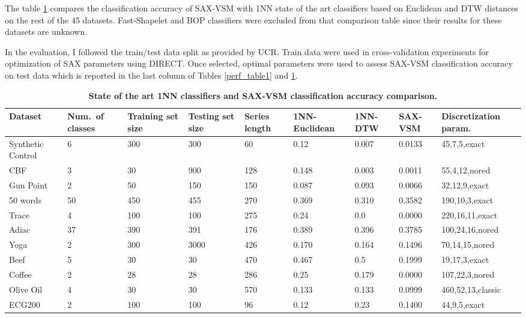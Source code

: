 The table \ref{perf_table2} compares the classification accuracy of SAX-VSM with 
1NN state of the art classifiers based on Euclidean and DTW distances on the rest of the 45 datasets. 
Fast-Shapelet and BOP classifiers were excluded from that comparison table since their 
results for these datasets are unknown.

In the evaluation, I followed the train/test data split as provided by UCR. Train data were used 
in cross-validation experiments for optimization of SAX parameters using \mbox{DIRECT}. 
Once selected, optimal parameters were used to assess SAX-VSM classification 
accuracy on test data which is reported in the last column of Tables \ref{perf_table1} 
and \ref{perf_table2}.

\newpage

\begin{table}[t!]
\caption{\bf State of the art 1NN classifiers and SAX-VSM classification accuracy comparison.}
 \label{perf_table2}
\centering
{\setlength{\extrarowheight}{1pt}%
{\scriptsize
\begin{tabularx}{\linewidth}{@{} l *7X @{} l}
\hline
Dataset & \mbox{Num. of} classes & Training set size & Testing set size & Series length & 1NN-Euclidean & 1NN-DTW & SAX-VSM & Discretization param. \\
\hline
Synthetic Control & 6 & 300 & 300 & 60 & 0.12 & 0.007 & 0.0133 & 45,7,5,exact \\
CBF & 3 & 30 & 900 & 128 & 0.148 & 0.003 & 0.0011 & 55,4,12,nored \\
Gun Point & 2 & 50 & 150 & 150 & 0.087 & 0.093 & 0.0066 & 32,12,9,exact \\
50 words & 50 & 450 & 455 & 270 & 0.369 & 0.310 & 0.3582 & 190,10,3,exact \\ 
Trace & 4 & 100 & 100 & 275 & 0.24 & 0.0 & 0.0000 & 220,16,11,exact \\
Adiac & 37 & 390 & 391 & 176 & 0.389 & 0.396 & 0.3785 & 100,24,16,nored \\
Yoga & 2 & 300 & 3000 & 426 & 0.170 & 0.164 & 0.1496 & 70,14,15,nored \\ 
Beef & 5 & 30 & 30 & 470 & 0.467 & 0.5 & 0.1999 & 19,17,3,exact \\ 
Coffee & 2 & 28 & 28 & 286 & 0.25 & 0.179 & 0.0000 & 107,22,3,nored \\
Olive Oil & 4 & 30 & 30 & 570 & 0.133 & 0.133 & 0.0999 & 460,52,13,classic \\
ECG200 & 2 & 100 & 100 & 96 & 0.12 & 0.23 & 0.1400 & 44,9,5,exact \\

\end{tabularx}}}
\end{table}
